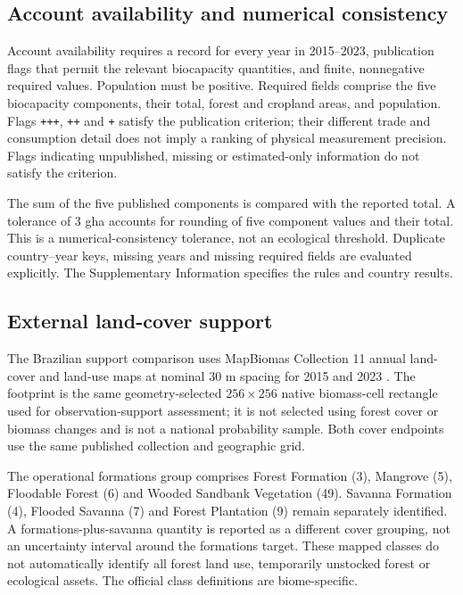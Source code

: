 \documentclass[11pt,a4paper]{article}
\begin{document}
\subsection{Account availability and numerical consistency}
Account availability requires a record for every year in 2015--2023, publication flags that permit the relevant biocapacity quantities, and finite, nonnegative required values. Population must be positive. Required fields comprise the five biocapacity components, their total, forest and cropland areas, and population. Flags \texttt{+++}, \texttt{++} and \texttt{+} satisfy the publication criterion; their different trade and consumption detail does not imply a ranking of physical measurement precision. Flags indicating unpublished, missing or estimated-only information do not satisfy the criterion.

The sum of the five published components is compared with the reported total. A tolerance of 3 gha accounts for rounding of five component values and their total. This is a numerical-consistency tolerance, not an ecological threshold. Duplicate country--year keys, missing years and missing required fields are evaluated explicitly. The Supplementary Information specifies the rules and country results.

\subsection{External land-cover support}
The Brazilian support comparison uses MapBiomas Collection 11 annual land-cover and land-use maps at nominal 30 m spacing for 2015 and 2023 \citep{MapBiomas2026}. The footprint is the same geometry-selected $256\times256$ native biomass-cell rectangle used for observation-support assessment; it is not selected using forest cover or biomass changes and is not a national probability sample. Both cover endpoints use the same published collection and geographic grid.

The operational formations group comprises Forest Formation (3), Mangrove (5), Floodable Forest (6) and Wooded Sandbank Vegetation (49). Savanna Formation (4), Flooded Savanna (7) and Forest Plantation (9) remain separately identified. A formations-plus-savanna quantity is reported as a different cover grouping, not an uncertainty interval around the formations target. These mapped classes do not automatically identify all forest land use, temporarily unstocked forest or ecological assets. The official class definitions are biome-specific.
\end{document}
